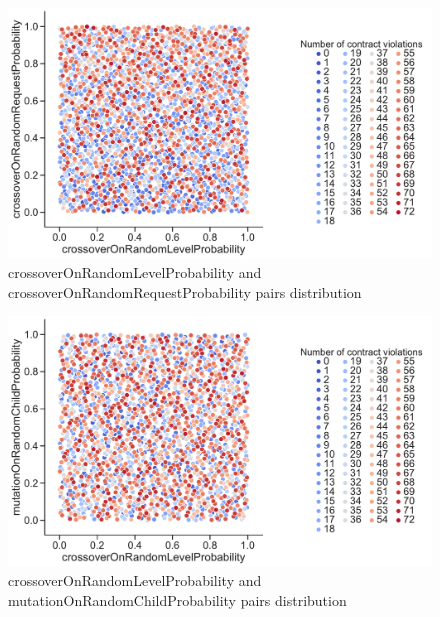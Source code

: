 \begin{figure}
	\centering
	\includegraphics[width=\textwidth]{images/PairsDistr/crossoverOnRandomLevelProbability_crossoverOnRandomRequestProbability.pdf}
	\caption[crossoverOnRandomLevelProbability and crossoverOnRandomRequestProbability pairs distribution]{crossoverOnRandomLevelProbability and crossoverOnRandomRequestProbability pairs distribution}
	\label{fig:crossoverOnRandomLevelProbability_crossoverOnRandomRequestProbability_pair}
\end{figure}
\begin{figure}
	\centering
	\includegraphics[width=\textwidth]{images/PairsDistr/crossoverOnRandomLevelProbability_mutationOnRandomChildProbability.pdf}
	\caption[crossoverOnRandomLevelProbability and mutationOnRandomChildProbability pairs distribution]{crossoverOnRandomLevelProbability and mutationOnRandomChildProbability pairs distribution}
	\label{fig:crossoverOnRandomLevelProbability_mutationOnRandomChildProbability_pair}
\end{figure}
